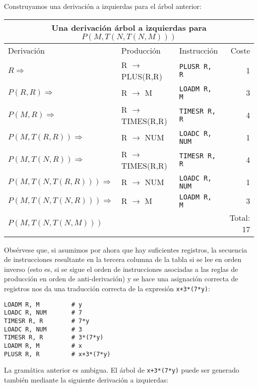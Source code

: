 Construyamos una derivación a izquierdas para el árbol anterior:

\begin{center}
\begin{tabular}{|l|l|p{3cm}|r|}
\hline
\multicolumn{4}{|c|}{ Una derivación árbol a izquierdas para $P(M,T(N,T(N,M)))$}\\
\hline
Derivación                            & Producción                 & Instrucción          & Coste\\
\hline
$R \Longrightarrow$                   & R $\rightarrow$ PLUS(R,R)  &   \verb|PLUSR R, R|  & 1\\
\hline
$P(R,R) \Longrightarrow$              & R $\rightarrow$ M          &   \verb|LOADM R, M|  & 3\\ 
\hline
$P(M,R) \Longrightarrow$              & R $\rightarrow$ TIMES(R,R) &  \verb|TIMESR R, R|  & 4\\
\hline
$P(M, T(R, R)) \Longrightarrow$       & R $\rightarrow$ NUM        &  \verb|LOADC R, NUM| & 1\\
\hline
$P(M, T(N, R)) \Longrightarrow$       & R $\rightarrow$ TIMES(R,R) &  \verb|TIMESR R, R|  & 4\\
\hline
$P(M, T(N, T(R, R))) \Longrightarrow$ & R $\rightarrow$ NUM        &  \verb|LOADC R, NUM| & 1\\
\hline
$P(M, T(N, T(N, R))) \Longrightarrow$ & R $\rightarrow$ M          &  \verb|LOADM R, M|   & 3\\
\hline
$P(M,T(N,T(N,M))) $                     &                            &                      & Total: 17\\
\hline
\end{tabular}
\end{center}

Obsérvese que, si asumimos por ahora que hay suficientes registros, la secuencia
de instrucciones resultante en la tercera columna de la tabla si se lee en orden inverso
(esto es, si se sigue el orden de instrucciones asociadas a las reglas de producción
en orden de anti-derivación)
y se hace una asignación correcta de registros nos da una traducción correcta
de la expresión \verb|x+3*(7*y)|:

\begin{verbatim}
LOADM R, M         # y 
LOADC R, NUM       # 7
TIMESR R, R        # 7*y
LOADC R, NUM       # 3
TIMESR R, R        # 3*(7*y)
LOADM R, M         # x
PLUSR R, R         # x+3*(7*y)
\end{verbatim}

La gramática anterior es ambigua. El árbol de \verb|x+3*(7*y)|
puede ser generado también mediante la siguiente derivación 
a izquierdas:

